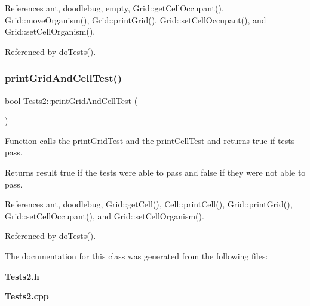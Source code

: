 References ant, doodlebug, empty, Grid\+::get\+Cell\+Occupant(), Grid\+::move\+Organism(), Grid\+::print\+Grid(), Grid\+::set\+Cell\+Occupant(), and Grid\+::set\+Cell\+Organism().



Referenced by do\+Tests().

\mbox{\label{classTests2_a5c27bd3a353488311cbc4323d34baa00}} 
\subsubsection{print\+Grid\+And\+Cell\+Test()}
{\footnotesize\ttfamily bool Tests2\+::print\+Grid\+And\+Cell\+Test (\begin{DoxyParamCaption}{ }\end{DoxyParamCaption})}

Function calls the print\+Grid\+Test and the print\+Cell\+Test and returns true if tests pass.

\begin{DoxyReturn}{Returns}
result true if the tests were able to pass and false if they were not able to pass. 
\end{DoxyReturn}


References ant, doodlebug, Grid\+::get\+Cell(), Cell\+::print\+Cell(), Grid\+::print\+Grid(), Grid\+::set\+Cell\+Occupant(), and Grid\+::set\+Cell\+Organism().



Referenced by do\+Tests().



The documentation for this class was generated from the following files\+:\begin{DoxyCompactItemize}
\item 
\textbf{ Tests2.\+h}\item 
\textbf{ Tests2.\+cpp}\end{DoxyCompactItemize}
